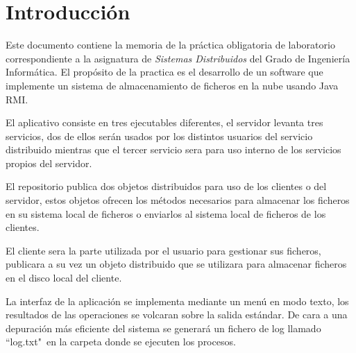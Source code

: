 
\chapter{Introducción}

Este documento contiene la memoria de la práctica obligatoria de laboratorio correspondiente a la asignatura de \emph{Sistemas Distribuidos} del Grado de Ingeniería Informática. El propósito de la practica es el desarrollo de un software que implemente un sistema de almacenamiento de ficheros en la nube usando Java RMI.

El aplicativo consiste en tres ejecutables diferentes, el servidor levanta tres servicios, dos de ellos serán usados por los distintos usuarios del servicio distribuido mientras que el tercer servicio sera para uso interno de los servicios propios del servidor.

El repositorio publica dos objetos distribuidos para uso de los clientes o del servidor, estos objetos ofrecen los métodos necesarios para almacenar los ficheros en su sistema local de ficheros o enviarlos al sistema local de ficheros de los clientes.

El cliente sera la parte utilizada por el usuario para gestionar sus ficheros, publicara a su vez un objeto distribuido que se utilizara para almacenar ficheros en el disco local del cliente.

La interfaz de la aplicación se implementa mediante un menú en modo texto, los resultados de las operaciones se volcaran sobre la salida estándar. De cara a una depuración más eficiente del sistema se generará un fichero de log llamado ``log.txt"\ en la carpeta donde se ejecuten los procesos.

